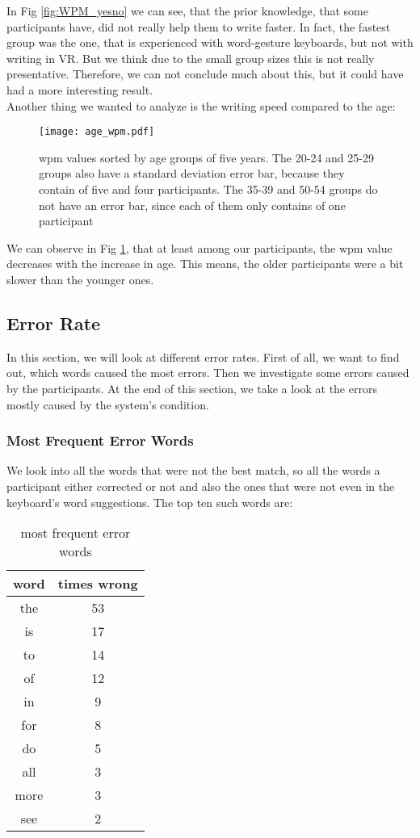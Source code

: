 In Fig \ref{fig:WPM_yesno} we can see, that the prior knowledge, that some participants have, did not really help them to write faster. In fact, the fastest group was the one, that is experienced with word-gesture keyboards, but not with writing in VR. But we think due to the small group sizes this is not really presentative. Therefore, we can not conclude much about this, but it could have had a more interesting result.\\

Another thing we wanted to analyze is the writing speed compared to the age:
\begin{figure}[H]
    \centering
    \texttt{[image: age\_wpm.pdf]}
    \caption{wpm values sorted by age groups of five years. The 20-24 and 25-29 groups also have a standard deviation error bar, because they contain of five and four participants. The 35-39 and 50-54 groups do not have an error bar, since each of them only contains of one participant}
    \label{fig:WPM_age}
\end{figure}

We can observe in Fig \ref{fig:WPM_age}, that at least among our participants, the wpm value decreases with the increase in age. This means, the older participants were a bit slower than the younger ones. 

\subsection{Error Rate}
In this section, we will look at different error rates. First of all, we want to find out, which words caused the most errors. Then we investigate some errors caused by the participants. At the end of this section, we take a look at the errors mostly caused by the system's condition.

\subsubsection{Most Frequent Error Words}
We look into all the words that were not the best match, so all the words a participant either corrected or not and also the ones that were not even in the keyboard's word suggestions. The top ten such words are:
\begin{table}[H]
    \centering
    \caption{most frequent error words}
    \begin{tabular}{cc} \toprule
        word&times wrong\\ \midrule
        the & 53\\
        is & 17\\
        to & 14\\
        of & 12\\
        in & 9\\
        for & 8\\
        do & 5\\
        all & 3\\
        more & 3\\
        see & 2\\
        \bottomrule
    \end{tabular}
    \label{tab:error_words}
\end{table}

